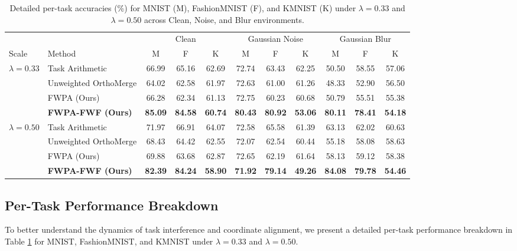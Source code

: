 \documentclass{article}
\theoremstyle{plain}
\theoremstyle{definition}
\theoremstyle{remark}
\begin{document}
\begin{table}[t]
\caption{Detailed per-task accuracies (\%) for MNIST (M), FashionMNIST (F), and KMNIST (K) under $\lambda=0.33$ and $\lambda=0.50$ across Clean, Noise, and Blur environments.}
\label{tab:per_task}
\vskip 0.02in
\begin{center}
\begin{scriptsize}
\begin{sc}
\setlength{\tabcolsep}{4.0pt}
\begin{tabular}{llccccccccc}
\toprule
& & \multicolumn{3}{c}{Clean} & \multicolumn{3}{c}{Gaussian Noise} & \multicolumn{3}{c}{Gaussian Blur} \\
\cmidrule(r){3-5} \cmidrule(r){6-8} \cmidrule(r){9-11}
Scale & Method & M & F & K & M & F & K & M & F & K \\
\midrule
$\lambda=0.33$ & Task Arithmetic & 66.99 & 65.16 & 62.69 & 72.74 & 63.43 & 62.25 & 50.50 & 58.55 & 57.06 \\
& Unweighted OrthoMerge & 64.02 & 62.58 & 61.97 & 72.63 & 61.00 & 61.26 & 48.33 & 52.90 & 56.50 \\
& FWPA (Ours) & 66.28 & 62.34 & 61.13 & 72.75 & 60.23 & 60.68 & 50.79 & 55.51 & 55.38 \\
& \textbf{FWPA-FWF (Ours)} & \textbf{85.09} & \textbf{84.58} & \textbf{60.74} & \textbf{80.43} & \textbf{80.92} & \textbf{53.06} & \textbf{80.11} & \textbf{78.41} & \textbf{54.18} \\
\midrule
$\lambda=0.50$ & Task Arithmetic & 71.97 & 66.91 & 64.07 & 72.58 & 65.58 & 61.39 & 63.13 & 62.02 & 60.63 \\
& Unweighted OrthoMerge & 68.43 & 64.42 & 62.55 & 72.07 & 62.54 & 60.44 & 55.18 & 58.08 & 58.63 \\
& FWPA (Ours) & 69.88 & 63.68 & 62.87 & 72.65 & 62.19 & 61.64 & 58.13 & 59.12 & 58.38 \\
& \textbf{FWPA-FWF (Ours)} & \textbf{82.39} & \textbf{84.24} & \textbf{58.90} & \textbf{71.92} & \textbf{79.14} & \textbf{49.26} & \textbf{84.08} & \textbf{79.78} & \textbf{54.46} \\
\bottomrule
\end{tabular}
\end{sc}
\end{scriptsize}
\end{center}
\vskip -0.15in
\end{table}

\subsection{Per-Task Performance Breakdown}
To better understand the dynamics of task interference and coordinate alignment, we present a detailed per-task performance breakdown in Table \ref{tab:per_task} for MNIST, FashionMNIST, and KMNIST under $\lambda=0.33$ and $\lambda=0.50$.
\end{document}
